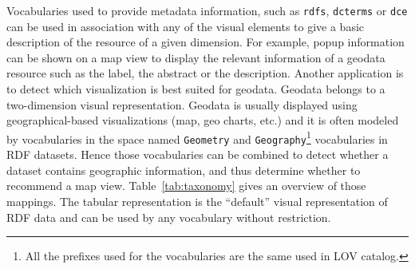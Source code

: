  Vocabularies used to provide metadata information, such as \texttt{rdfs}, \texttt{dcterms} or \texttt{dce} can be used in association with any of the visual elements to give a basic description of the resource of a given dimension. For example, popup information can be shown on a map view to display the relevant information of a geodata resource such as the label, the abstract or the description.
Another application is to detect which visualization is best suited for geodata. Geodata belongs to a  two-dimension visual representation. Geodata is usually displayed using geographical-based visualizations (map, geo charts, etc.) and it is often modeled by vocabularies in the space named \texttt{Geometry} and \texttt{Geography}\footnote{All the prefixes used for the vocabularies are the same used in LOV catalog.}   vocabularies in RDF datasets. Hence those vocabularies can be combined to detect whether a dataset contains geographic information, and thus determine whether to recommend a map view. Table~\ref{tab:taxonomy} gives an overview of those mappings. The tabular representation is the ``default'' visual representation of RDF data and can be used by any vocabulary without restriction.


\begin{table}[!htbp]
\end{table}


